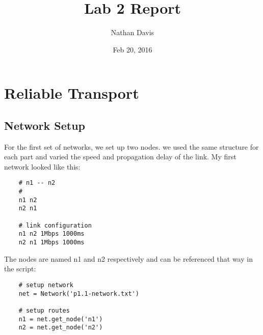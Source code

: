 \documentclass[11pt]{article}
\begin{document}
\lstset{
  language=Python,
  basicstyle=\small,          %
  keywordstyle=\bfseries,
  identifierstyle=,           %
  commentstyle=,              %
  stringstyle=\ttfamily,      %
  showstringspaces=false,     %
  numbers=left,
  numberstyle=\tiny,
  numbersep=5pt,
  frame=tb,
}

\title{Lab 2 Report}

\author{Nathan Davis}

\date{Feb 20, 2016}

\maketitle

\section{Reliable Transport}

\subsection{Network Setup}

For the first set of networks, we set up two nodes. we used the same structure for each part and varied the speed and propagation delay of the link. My first network looked like this:

\vspace{5mm}

\begin{lstlisting}
    # n1 -- n2
    #
    n1 n2
    n2 n1

    # link configuration
    n1 n2 1Mbps 1000ms
    n2 n1 1Mbps 1000ms
\end{lstlisting}

\vspace{5mm}

The nodes are named n1 and n2 respectively and can be referenced that way in the script:

\vspace{5mm}

\begin{lstlisting}
    # setup network
    net = Network('p1.1-network.txt')

    # setup routes
    n1 = net.get_node('n1')
    n2 = net.get_node('n2')
\end{lstlisting}

\vspace{5mm}
\end{document}
